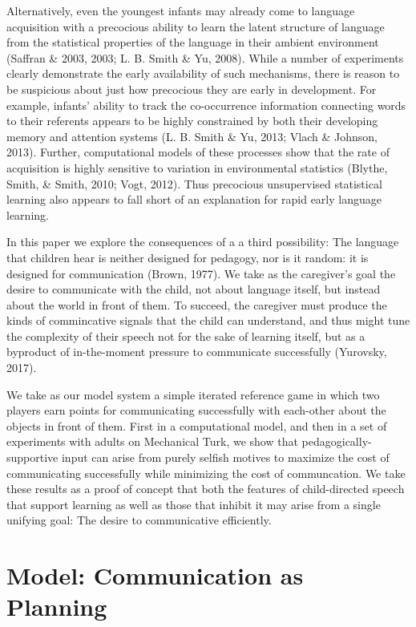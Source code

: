 \documentclass[10pt, letterpaper]{article}
\begin{document}
Alternatively, even the youngest infants may already come to language
acquisition with a precocious ability to learn the latent structure of
language from the statistical properties of the language in their
ambient environment (Saffran \& 2003, 2003; L. B. Smith \& Yu, 2008).
While a number of experiments clearly demonstrate the early availability
of such mechanisms, there is reason to be suspicious about just how
precocious they are early in development. For example, infants' ability
to track the co-occurrence information connecting words to their
referents appears to be highly constrained by both their developing
memory and attention systems (L. B. Smith \& Yu, 2013; Vlach \& Johnson,
2013). Further, computational models of these processes show that the
rate of acquisition is highly sensitive to variation in environmental
statistics (Blythe, Smith, \& Smith, 2010; Vogt, 2012). Thus precocious
unsupervised statistical learning also appears to fall short of an
explanation for rapid early language learning.

In this paper we explore the consequences of a a third possibility: The
language that children hear is neither designed for pedagogy, nor is it
random: it is designed for communication (Brown, 1977). We take as the
caregiver's goal the desire to communicate with the child, not about
language itself, but instead about the world in front of them. To
succeed, the caregiver must produce the kinds of commincative signals
that the child can understand, and thus might tune the complexity of
their speech not for the sake of learning itself, but as a byproduct of
in-the-moment pressure to communicate successfully (Yurovsky, 2017).

We take as our model system a simple iterated reference game in which
two players earn points for communicating successfully with each-other
about the objects in front of them. First in a computational model, and
then in a set of experiments with adults on Mechanical Turk, we show
that pedagogically-supportive input can arise from purely selfish
motives to maximize the cost of communicating successfully while
minimizing the cost of communcation. We take these results as a proof of
concept that both the features of child-directed speech that support
learning as well as those that inhibit it may arise from a single
unifying goal: The desire to communicative efficiently.

\section{Model: Communication as
Planning}\label{model-communication-as-planning}
\end{document}
